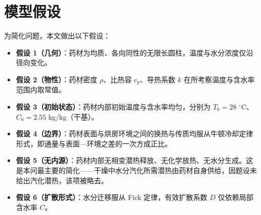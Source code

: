 \section{模型假设}
为简化问题，本文做出以下假设：
\begin{itemize}
  \item \textbf{假设 1（几何）}：药材为均质、各向同性的无限长圆柱，温度与水分浓度仅沿径向变化。
  \item \textbf{假设 2（物性）}：药材密度 $\rho$、比热容 $c_p$、导热系数 $k$ 在所考察温度与含水率范围内取常值。
  \item \textbf{假设 3（初始状态）}：药材内部初始温度与含水率均匀，分别为 $T_0=28$ $^\circ$C、$C_0=2.55$ kg/kg（干基）。
  \item \textbf{假设 4（边界）}：药材表面与烘房环境之间的换热与传质均服从牛顿冷却定律形式，即通量与表面—环境之差的一次方成正比。
  \item \textbf{假设 5（无内源）}：药材内部无相变潜热释放、无化学放热、无水分生成。这是本问最主要的简化——干燥中水分汽化所需潜热由药材自身供给，因题设未给出汽化潜热，该项被略去。
  \item \textbf{假设 6（扩散形式）}：水分迁移服从 Fick 定律，有效扩散系数 $D$ 仅依赖局部含水率 $C$。
\end{itemize}
